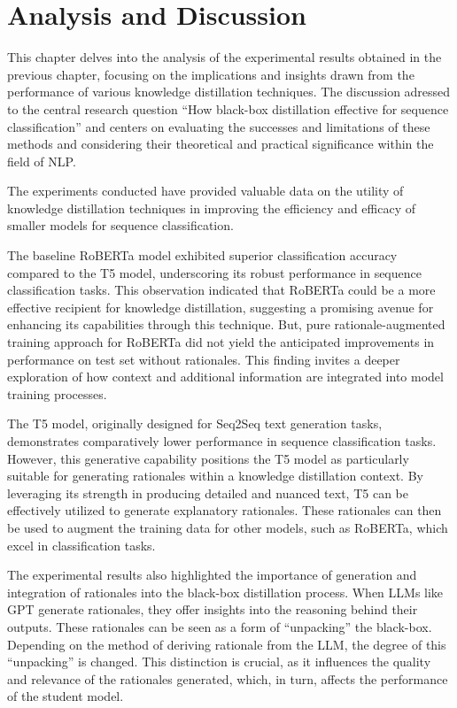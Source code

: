\chapter{Analysis and Discussion}
\label{chap:eval}

This chapter delves into the analysis of the experimental results obtained in the previous chapter, focusing on the implications and insights drawn from the performance of various knowledge distillation techniques. The discussion adressed to the central research question ``How black-box distillation effective for sequence classification'' and centers on evaluating the successes and limitations of these methods and considering their theoretical and practical significance within the field of NLP\@.

The experiments conducted have provided valuable data on the utility of knowledge distillation techniques in improving the efficiency and efficacy of smaller models for sequence classification.

The baseline RoBERTa model exhibited superior classification accuracy compared to the T5 model, underscoring its robust performance in sequence classification tasks. This observation indicated that RoBERTa could be a more effective recipient for knowledge distillation, suggesting a promising avenue for enhancing its capabilities through this technique. But, pure rationale-augmented training approach for RoBERTa did not yield the anticipated improvements in performance on test set without rationales. This finding invites a deeper exploration of how context and additional information are integrated into model training processes. 

The T5 model, originally designed for Seq2Seq text generation tasks, demonstrates comparatively lower performance in sequence classification tasks. However, this generative capability positions the T5 model as particularly suitable for generating rationales within a knowledge distillation context. By leveraging its strength in producing detailed and nuanced text, T5 can be effectively utilized to generate explanatory rationales. These rationales can then be used to augment the training data for other models, such as RoBERTa, which excel in classification tasks.

The experimental results also highlighted the importance of generation and integration of rationales into the black-box distillation process. When LLMs like GPT generate rationales, they offer insights into the reasoning behind their outputs. These rationales can be seen as a form of ``unpacking'' the black-box. Depending on the method of deriving rationale from the LLM, the degree of this ``unpacking'' is changed. This distinction is crucial, as it influences the quality and relevance of the rationales generated, which, in turn, affects the performance of the student model.

